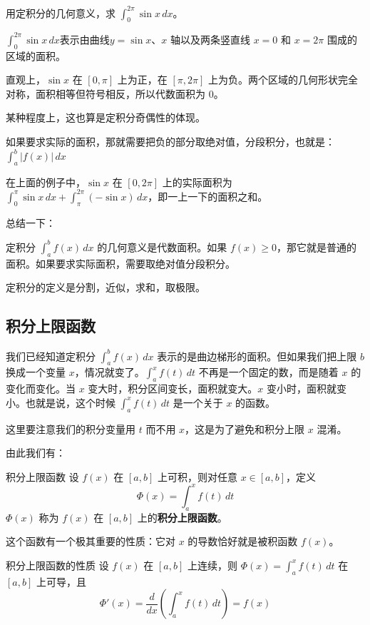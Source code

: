 \begin{myexample}
  用定积分的几何意义，求 $\int_0^{2\pi} \sin x\, dx$。

  $\int_0^{2\pi} \sin x\, dx$表示由曲线$y=\sin x$、$x$ 轴以及两条竖直线 $x = 0$ 和 $x = 2\pi$ 围成的区域的面积。

  直观上，$\sin x$ 在 $[0, \pi]$ 上为正，在 $[\pi, 2\pi]$ 上为负。两个区域的几何形状完全对称，面积相等但符号相反，所以代数面积为 $0$。
\end{myexample}

某种程度上，这也算是定积分奇偶性的体现。

如果要求实际的面积，那就需要把负的部分取绝对值，分段积分，也就是：\(\int_a^b |f(x)|\, dx\)

在上面的例子中，$\sin x$ 在 $[0, 2\pi]$ 上的实际面积为 $\int_0^\pi \sin x\, dx + \int_\pi^{2\pi} (-\sin x)\, dx$，即一上一下的面积之和。

总结一下：

定积分 $\int_a^b f(x)\, dx$ 的几何意义是代数面积。如果 $f(x) \geq 0$，那它就是普通的面积。如果要求实际面积，需要取绝对值分段积分。

定积分的定义是分割，近似，求和，取极限。


\subsection{积分上限函数}

我们已经知道定积分 $\int_a^b f(x)\,dx$ 表示的是曲边梯形的面积。但如果我们把上限 $b$ 换成一个变量 $x$，情况就变了。$\int_a^x f(t)\,dt$ 不再是一个固定的数，而是随着 $x$ 的变化而变化。当 $x$ 变大时，积分区间变长，面积就变大。$x$ 变小时，面积就变小。也就是说，这个时候 $\int_a^x f(t)\,dt$ 是一个关于 $x$ 的函数。

这里要注意我们的积分变量用 $t$ 而不用 $x$，这是为了避免和积分上限 $x$ 混淆。

由此我们有：

\begin{definition}{积分上限函数}{}
设 $f(x)$ 在 $[a, b]$ 上可积，则对任意 $x \in [a, b]$，定义
\[
\Phi(x) = \int_a^x f(t)\, dt
\]
$\Phi(x)$ 称为 $f(x)$ 在 $[a, b]$ 上的\textbf{积分上限函数}。
\end{definition}

这个函数有一个极其重要的性质：它对 $x$ 的导数恰好就是被积函数 $f(x)$。

\begin{theorem}{积分上限函数的性质}{}
设 $f(x)$ 在 $[a, b]$ 上连续，则 $\Phi(x) = \int_a^x f(t)\, dt$ 在 $[a, b]$ 上可导，且
\[
\Phi'(x) = \frac{d}{dx} (\int_a^x f(t)\, dt) = f(x)
\]
\end{theorem}

